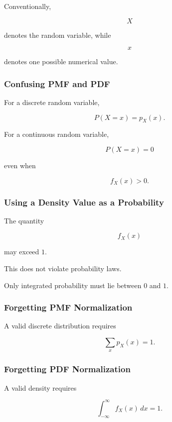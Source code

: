 Conventionally,

\[
X
\]

denotes the random variable, while

\[
x
\]

denotes one possible numerical value.

\subsubsection{Confusing PMF and PDF}

For a discrete random variable,

\[
P(X=x)
=
p_X(x).
\]

For a continuous random variable,

\[
P(X=x)=0
\]

even when

\[
f_X(x)>0.
\]

\subsubsection{Using a Density Value as a Probability}

The quantity

\[
f_X(x)
\]

may exceed \(1\).

This does not violate probability laws.

Only integrated probability must lie between \(0\) and \(1\).

\subsubsection{Forgetting PMF Normalization}

A valid discrete distribution requires

\[
\boxed{
\sum_xp_X(x)=1.
}
\]

\subsubsection{Forgetting PDF Normalization}

A valid density requires

\[
\boxed{
\int_{-\infty}^{\infty}f_X(x)\,dx=1.
}
\]

